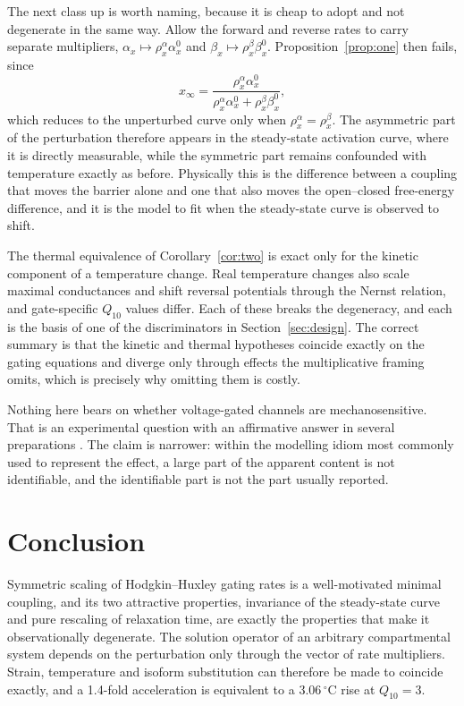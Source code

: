 The next class up is worth naming, because it is cheap to adopt and not
degenerate in the same way. Allow the forward and reverse rates to carry
separate multipliers, $\alpha_x\mapsto\rho^{\alpha}_{x}\alpha^0_x$ and
$\beta_x\mapsto\rho^{\beta}_{x}\beta^0_x$. Proposition~\ref{prop:one} then
fails, since
\begin{equation*}
x_\infty=\frac{\rho^{\alpha}_x\alpha^0_x}
{\rho^{\alpha}_x\alpha^0_x+\rho^{\beta}_x\beta^0_x},
\end{equation*}
which reduces to the unperturbed curve only when
$\rho^{\alpha}_x=\rho^{\beta}_x$. The asymmetric part of the perturbation
therefore appears in the steady-state activation curve, where it is directly
measurable, while the symmetric part remains confounded with temperature exactly
as before. Physically this is the difference between a coupling that moves the
barrier alone and one that also moves the open--closed free-energy difference,
and it is the model to fit when the steady-state curve is observed to shift.

The thermal equivalence of Corollary~\ref{cor:two} is exact only for the kinetic
component of a temperature change. Real temperature changes also scale maximal
conductances and shift reversal potentials through the Nernst relation, and
gate-specific $Q_{10}$ values differ. Each of these breaks the degeneracy, and
each is the basis of one of the discriminators in Section~\ref{sec:design}. The
correct summary is that the kinetic and thermal hypotheses coincide exactly on
the gating equations and diverge only through effects the multiplicative
framing omits, which is precisely why omitting them is costly.

Nothing here bears on whether voltage-gated channels are mechanosensitive. That
is an experimental question with an affirmative answer in several preparations
\citep{morris2007,coste2010,murthy2017}. The claim is narrower: within the
modelling idiom most commonly used to represent the effect, a large part of the
apparent content is not identifiable, and the identifiable part is not the part
usually reported.

\section{Conclusion}

Symmetric scaling of Hodgkin--Huxley gating rates is a well-motivated minimal
coupling, and its two attractive properties, invariance of the steady-state
curve and pure rescaling of relaxation time, are exactly the properties that
make it observationally degenerate. The solution operator of an arbitrary
compartmental system depends on the perturbation only through the vector of rate
multipliers. Strain, temperature and isoform substitution can therefore be made
to coincide exactly, and a 1.4-fold acceleration is equivalent to a
$3.06\,^{\circ}$C rise at $Q_{10}=3$.

